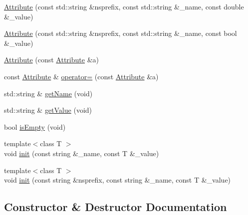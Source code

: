 \begin{DoxyCompactItemize}
\item 
\mbox{\hyperlink{classXMLWriterAPI_1_1Attribute_a501528e4f1a7b1cabeaf7cfc21c0b97d}{Attribute}} (const std\+::string \&nsprefix, const std\+::string \&\+\_\+name, const double \&\+\_\+value)
\item 
\mbox{\hyperlink{classXMLWriterAPI_1_1Attribute_ac570bd81cf851adca96d3b28eaa58c3e}{Attribute}} (const std\+::string \&nsprefix, const std\+::string \&\+\_\+name, const bool \&\+\_\+value)
\item 
\mbox{\hyperlink{classXMLWriterAPI_1_1Attribute_a44b71cf3ef8f67bb010561184f1678d1}{Attribute}} (const \mbox{\hyperlink{classXMLWriterAPI_1_1Attribute}{Attribute}} \&a)
\item 
const \mbox{\hyperlink{classXMLWriterAPI_1_1Attribute}{Attribute}} \& \mbox{\hyperlink{classXMLWriterAPI_1_1Attribute_a073917fc63e79e3f44d26c8a689d40e4}{operator=}} (const \mbox{\hyperlink{classXMLWriterAPI_1_1Attribute}{Attribute}} \&a)
\item 
std\+::string \& \mbox{\hyperlink{classXMLWriterAPI_1_1Attribute_a7ad56e533adb981e46f9373d1631388c}{get\+Name}} (void)
\item 
std\+::string \& \mbox{\hyperlink{classXMLWriterAPI_1_1Attribute_aed17d7d4a0c883d240090c7c42599854}{get\+Value}} (void)
\item 
bool \mbox{\hyperlink{classXMLWriterAPI_1_1Attribute_a5d51eb94811cbc00beb32d68af4ed1fe}{is\+Empty}} (void)
\item 
{\footnotesize template$<$class T $>$ }\\void \mbox{\hyperlink{classXMLWriterAPI_1_1Attribute_a42559a2d559f948f2bd4e084f9c1379d}{init}} (const string \&\+\_\+name, const T \&\+\_\+value)
\item 
{\footnotesize template$<$class T $>$ }\\void \mbox{\hyperlink{classXMLWriterAPI_1_1Attribute_a0c9c9428e36e3d0f370ee6a97142f408}{init}} (const string \&nsprefix, const string \&\+\_\+name, const T \&\+\_\+value)
\end{DoxyCompactItemize}


\subsection{Constructor \& Destructor Documentation}
\mbox{\label{classXMLWriterAPI_1_1Attribute_aa189cc062d6094349bf642ad149d166b}} 
